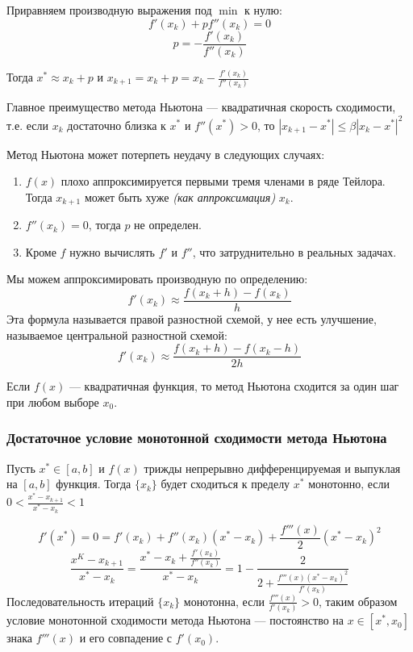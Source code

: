 Приравняем производную выражения под \(\min\) к нулю:
\[f'(x_k) + pf''(x_k) = 0\]
\[p = -\frac{f'(x_k)}{f''(x_k)} \]

Тогда \(x^* \approx x_k + p\) и \(x_{k+1} = x_k + p = x_k - \frac{f'(x_k)}{f''(x_k)} \)

Главное преимущество метода Ньютона --- квадратичная скорость сходимости, т.е. если \(x_k\) достаточно близка к \(x^*\) и \(f''(x^*) > 0\), то \(|x_{k+1} - x^*| \leq \beta|x_k - x^*|^2\)

Метод Ньютона может потерпеть неудачу в следующих случаях:
\begin{enumerate}
    \item \(f(x)\) плохо аппроксимируется первыми тремя членами в ряде Тейлора. Тогда \(x_{k+1}\) может быть хуже \textit{(как аппроксимация)} \(x_k\).
    \item \(f''(x_k) = 0\), тогда \(p\) не определен.
    \item Кроме \(f\) нужно вычислять \(f'\) и \(f''\), что затруднительно в реальных задачах.
\end{enumerate}

Мы можем аппроксимировать производную по определению:
\[f'(x_k) \approx \frac{f(x_k + h) - f(x_k)}{h} \]
Эта формула называется правой разностной схемой, у нее есть улучшение, называемое центральной разностной схемой:
\[f'(x_k) \approx \frac{f(x_k + h) - f(x_k - h)}{2h} \]

Если \(f(x)\) --- квадратичная функция, то метод Ньютона сходится за один шаг при любом выборе \(x_0\).

\subsubsection{Достаточное условие монотонной сходимости метода Ньютона}

Пусть \(x^* \in [a, b]\) и \(f(x)\) трижды непрерывно дифференцируемая и выпуклая на \([a, b]\) функция. Тогда \(\{x_k\}\) будет сходиться к пределу \(x^*\) монотонно, если \(0 < \frac{x^* - x_{k+1}}{x^* - x_k} < 1\)

\[f'(x^*) = 0 = f'(x_k) + f''(x_k)(x^* - x_k) + \frac{f'''(x)}{2} (x^* - x_k)^2\]
\[\frac{x^K - x_{k+1}}{x^* - x_k} = \frac{x^* - x_k + \frac{f'(x_k)}{f''(x_k)}}{x^* - x_k} = 1 - \frac{2}{2 + \frac{f'''(x) (x^* - x_k)^2}{f'(x_k)}}\]
Последовательность итераций \(\{x_k\}\) монотонна, если \(\frac{f'''(x)}{f'(x_k)} > 0\), таким образом условие монотонной сходимости метода Ньютона --- постоянство на \(x\in [x^*, x_0]\) знака \(f'''(x)\) и его совпадение с \(f'(x_0)\).

